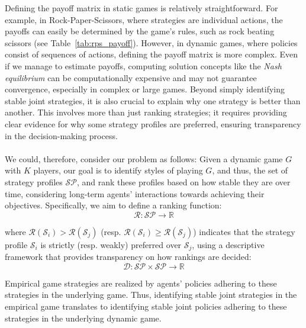 \begin{flushleft}
\begin{flushleft}
        Defining the payoff matrix in static games is relatively straightforward. For example, in Rock-Paper-Scissors, where strategies are individual actions, the payoffs can easily be determined by the game’s rules, such as rock beating scissors (see Table~\ref{tab:rps_payoff}). However, in dynamic games, where policies consist of sequences of actions, defining the payoff matrix is more complex. Even if we manage to estimate payoffs, computing solution concepts like the \emph{Nash equilibrium} can be computationally expensive and may not guarantee convergence, especially in complex or large games. Beyond simply identifying stable joint strategies, it is also crucial to explain why one strategy is better than another. This involves more than just ranking strategies; it requires providing clear evidence for why some strategy profiles are preferred, ensuring transparency in the decision-making process.\\~\\

        We could, therefore, consider our problem as follows: Given a dynamic game $G$ with $K$ players, our goal is to identify styles of playing $G$, and thus, the set of strategy profiles $\mathcal{SP}$, and rank these profiles based on how stable they are over time, considering long-term agents' interactions towards achieving their objectives. Specifically, we aim to define a ranking function:
        \begin{equation}
            \mathcal{R}: \mathcal{SP} \to \mathbb{R}
            \label{eq:ranking_function}
        \end{equation}
        
        where $\mathcal{R}(\mathcal{S}_i) > \mathcal{R}(\mathcal{S}_j)$ (resp. $\mathcal{R}(\mathcal{S}_i) \geq \mathcal{R}(\mathcal{S}_j)$) indicates that the strategy profile $\mathcal{S}_i$ is strictly (resp. weakly) preferred over $\mathcal{S}_j$, using a descriptive framework that provides transparency on how rankings are decided:
        \begin{equation}
            \mathcal{D}: \mathcal{SP} \times \mathcal{SP} \to \mathbb{R}
            \label{eq:descriptive framework}
        \end{equation}

        Empirical game strategies are realized by agents' policies adhering to these strategies in the underlying game. Thus, identifying stable joint strategies in the empirical game translates to identifying stable joint policies adhering to these strategies in the underlying dynamic game.


\end{flushleft}
\end{flushleft}
